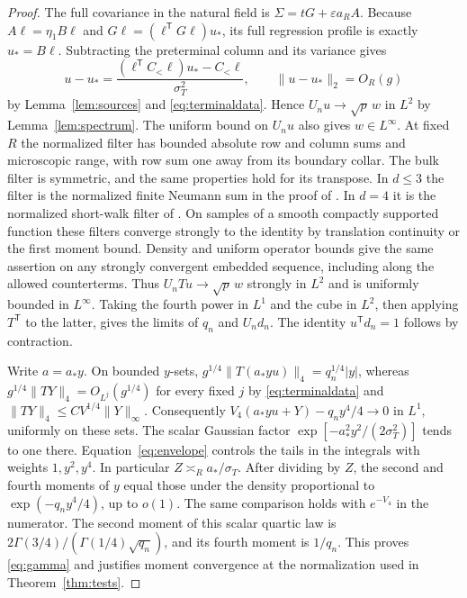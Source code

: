 \documentclass[11pt]{article}
\numberwithin{equation}{section}
\begin{document}
\begin{proof}
The full covariance in the natural field is $\Sigma=tG+\varepsilon a_RA$.
Because $A\ell=\eta_1 B\ell$ and $G\ell=(\ell^{\mathsf T}G\ell)u_*$,
its full regression profile is exactly $u_*=B\ell$. Subtracting the
preterminal column and its variance gives
\begin{equation}
 u-u_*=
   \frac{(\ell^{\mathsf T}C_<\ell)u_*-C_<\ell}{\sigma_T^2},
 \qquad \|u-u_*\|_2=O_R(g)
\end{equation}
by Lemma~\ref{lem:sources} and \eqref{eq:terminaldata}. Hence
$U_nu\to\sqrt p\,w$ in $L^2$ by Lemma~\ref{lem:spectrum}.
The uniform bound on $U_nu$ also gives $w\in L^\infty$.
At fixed $R$ the normalized filter has bounded absolute row and column
sums and microscopic range, with row sum one away from its boundary
collar. The bulk filter is symmetric, and the same properties hold
for its transpose. In $d\le3$ the filter is the normalized finite
Neumann sum in the proof of \cite[Proposition~7.2]{base}. In $d=4$
it is the normalized short-walk filter of \cite[Lemma~7.10]{base}.
On samples of a smooth compactly supported function
these filters converge strongly to the identity by translation
continuity or the first moment bound. Density and uniform operator
bounds give the same assertion on any strongly convergent embedded
sequence, including along the allowed counterterms. Thus
$U_nTu\to\sqrt p\,w$ strongly in $L^2$ and is uniformly bounded
in $L^\infty$. Taking the fourth power in $L^1$ and the cube in
$L^2$, then applying $T^{\mathsf T}$ to the latter, gives the limits
of $q_n$ and $U_nd_n$. The identity $u^{\mathsf T}d_n=1$ follows
by contraction.

Write $a=a_*y$. On bounded $y$-sets,
$g^{1/4}\|T(a_*yu)\|_4=q_n^{1/4}|y|$, whereas
$g^{1/4}\|TY\|_4=O_{L^j}(g^{1/4})$ for every fixed $j$
by \eqref{eq:terminaldata} and $\|TY\|_4\le C V^{1/4}\|Y\|_\infty$.
Consequently $V_4(a_*yu+Y)-q_n y^4/4\to0$ in $L^1$, uniformly
on these sets. The scalar Gaussian factor
$\exp[-a_*^2y^2/(2\sigma_T^2)]$ tends to one there.
Equation~\eqref{eq:envelope} controls the tails in the integrals
with weights $1,y^2,y^4$. In particular $Z\asymp_R a_*/\sigma_T$.
After dividing by $Z$, the second and fourth moments of $y$ equal
those under the density proportional to $\exp(-q_n y^4/4)$, up to
$o(1)$. The same comparison holds with $e^{-V_4}$ in the numerator.
The second moment of this scalar quartic law is
$2\Gamma(3/4)/(\Gamma(1/4)\sqrt{q_n})$, and its fourth moment
is $1/q_n$. This proves \eqref{eq:gamma} and justifies moment
convergence at the normalization used in Theorem~\ref{thm:tests}.


\end{proof}
\end{document}
